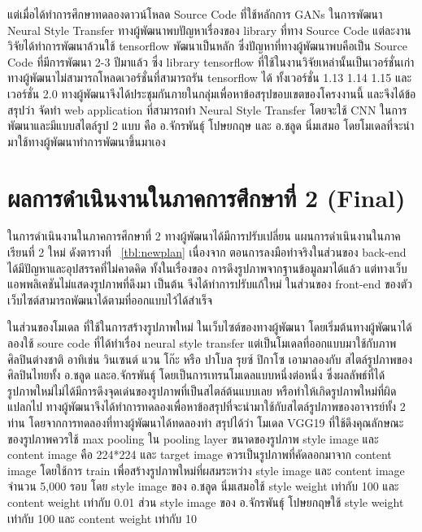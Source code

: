 \documentclass[12pt,oneside,openright,a4paper]{cpe-thai-project}
\begin{document}
\par\setlength{\parindent}{5ex}
แต่เมื่อได้ทำการศึกษาทดลองดาวน์โหลด Source Code ที่ใช้หลักการ GANs ในการพัฒนา Neural Style Transfer ทางผู้พัฒนาพบปัญหาเรื่องของ library ที่ทาง Source  Code แต่ละงานวิจัยได้ทำการพัฒนาล้วนใช้ tensorflow พัฒนาเป็นหลัก ซึ่งปัญหาที่ทางผู้พัฒนาพบคือเป็น Source Code ที่มีการพัฒนา 2-3 ปีมาแล้ว ซึ่ง library tensorflow ที่ใช้ในงานวิจัยเหล่านั้นเป็นเวอร์ชั่นเก่า ทางผู้พัฒนาไม่สามารถโหลดเวอร์ชั่นที่สามารถรัน tensorflow ได้ ทั้งเวอร์ชั่น 1.13 1.14 1.15 และเวอร์ชั่น 2.0 ทางผู้พัฒนาจึงได้ประชุมกันภายในกลุ่มเพื่อหาข้อสรุปขอบเขตของโครงงานนี้ และจึงได้ข้อสรุปว่า จัดทำ web application ที่สามารถทำ Neural Style Transfer โดยจะใช้ CNN ในการพัฒนาและมีแบบสไตล์รูป 2 แบบ คือ อ.จักรพันธุ์ โปษยกฤษ และ อ.ชลูด นิ่มเสมอ โดยโมเดลที่จะนำมาใช้ทางผู้พัฒนาทำการพัฒนาขึ้นมาเอง

\section{ผลการดำเนินงานในภาคการศึกษาที่ 2 (Final) }
\par\setlength{\parindent}{5ex}
ในการดำเนินงานในภาคการศึกษาที่ 2 ทางผู้พัฒนาได้มีการปรับเปลี่ยน แผนการดำเนินงานในภาคเรียนที่ 2 ใหม่ ดังตารางที่ ~\ref{tbl:newplan} เนื่องจาก ตอนการลงมือทำจริงในส่วนของ back-end ได้มีปัญหาและอุปสรรคที่ไม่คาดคิด ทั้งในเรื่องของ การดึงรูปภาพจากฐานข้อมูลมาได้แล้ว แต่ทางเว็บแอพพลิเคชันไม่แสดงรูปภาพที่ดึงมา เป็นต้น   จึงได้ทำการปรับแก้ใหม่ ในส่วนของ front-end ของตัวเว็บไซต์สามารถพัฒนาได้ตามที่ออกแบบไว้ได้สำเร็จ 
\par\setlength{\parindent}{5ex}
ในส่วนของโมเดล ที่ใช้ในการสร้างรูปภาพใหม่ ในเว็บไซต์ของทางผู้พัฒนา  โดยเริ่มต้นทางผู้พัฒนาได้ลองใช้ soure code ที่ได้ทำเรื่อง neural style transfer แต่เป็นโมเดลที่ออกแบบมาใช้กับภาพศิลปินต่างชาติ อาทิเช่น วินเซนต์ แวน โก๊ะ หรือ ปาโบล รุยซ์ ปิกาโซ เอามาลองกับ สไตล์รูปภาพของศิลปินไทยทั้ง อ.ชลูด และอ.จักรพันธุ์ โดยเป็นการเทรนโมเดลแบบหนึ่งต่อหนึ่ง ซึ่งผลลัพธ์ที่ได้ รูปภาพใหม่ไม่ได้มีการดึงจุดเด่นของรูปภาพที่เป็นสไตล์ต้นแบบเลย หรือทำให้เกิดรูปภาพใหม่ที่ผิดแปลกไป ทางผู้พัฒนาจึงได้ทำการทดลองเพื่อหาข้อสรุปที่จะนำมาใช้กับสไตล์รูปภาพของอาจารย์ทั้ง 2 ท่าน โดยจากการทดลองที่ทางผู้พัฒนาได้ทดลองทำ สรุปได้ว่า โมเดล VGG19 ที่ใช้ดึงคุณลักษณะของรูปภาพควรใช้ max pooling ใน pooling layer ขนาดของรูปภาพ style image และ content image คือ 224*224 และ target image ควรเป็นรูปภาพที่คัดลอกมาจาก content image โดยใช้การ train เพื่อสร้างรูปภาพใหม่ที่ผสมระหว่าง style image และ content image จำนวน 5,000 รอบ โดย style image ของ อ.ชลูด นิ่มเสมอใช้ style weight เท่ากับ 100 และ content weight เท่ากับ 0.01 ส่วน style image ของ อ.จักรพันธุ์ โปษยกฤษใช้  style weight เท่ากับ 100 และ content weight เท่ากับ 10
\end{document}

